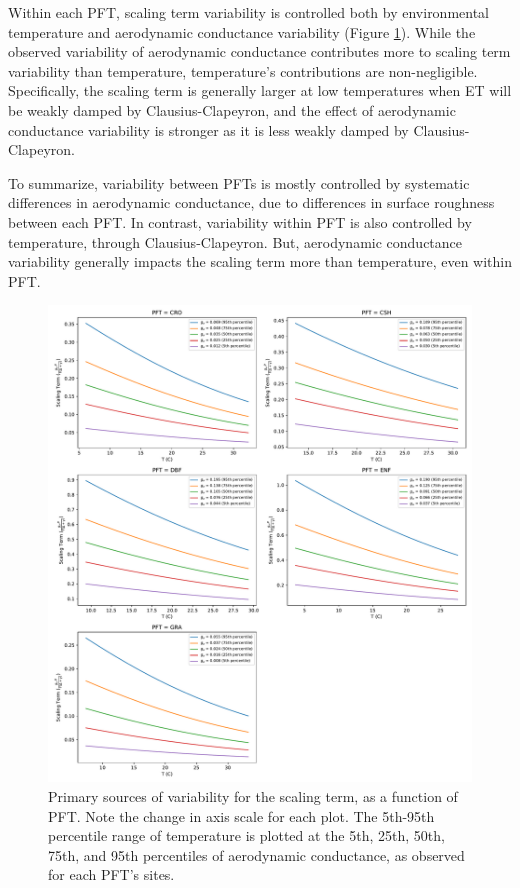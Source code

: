 \documentclass[draft,linenumbers]{agujournal}
\begin{document}
Within each PFT, scaling term variability is controlled both by environmental temperature and aerodynamic conductance variability (Figure \ref{scale_vary}). While the observed variability of aerodynamic conductance contributes more to scaling term variability than temperature, temperature's contributions are non-negligible. Specifically, the scaling term is generally larger at low temperatures when ET will be weakly damped by Clausius-Clapeyron, and the effect of aerodynamic conductance variability is stronger as it is less weakly damped by Clausius-Clapeyron.

To summarize, variability between PFTs is mostly controlled by systematic differences in aerodynamic conductance, due to differences in surface roughness between each PFT. In contrast, variability within PFT is also controlled by temperature, through Clausius-Clapeyron. But, aerodynamic conductance variability generally impacts the scaling term more than temperature, even within PFT.

\begin{figure}[h]
\centering
\includegraphics[width=\textwidth]{./fig04b.pdf}
\caption{Primary sources of variability for the scaling term, as a function of PFT. Note the change in axis scale for each plot. The 5th-95th percentile range of temperature is plotted at the 5th, 25th, 50th, 75th, and 95th percentiles of aerodynamic conductance, as observed for each PFT's sites.}
\label{scale_vary}
\end{figure}
\end{document}
